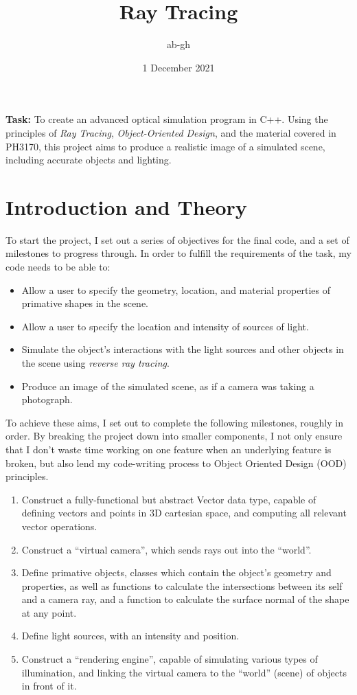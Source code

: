 \documentclass[a4paper]{article}
\title{Ray Tracing}
\author{ab-gh}
\date{1 December 2021}
\begin{document}
\maketitle

{\bf Task:} To create an advanced optical simulation program in C++. Using the principles of {\it Ray Tracing}, {\it Object-Oriented Design}, and the material covered in PH3170, this project aims to produce a realistic image of a simulated scene, including accurate objects and lighting.

\section{Introduction and Theory}
To start the project, I set out a series of objectives for the final code, and a set of milestones to progress through. In order to fulfill the requirements of the task, my code needs to be able to:
\begin{itemize}
  \item{Allow a user to specify the geometry, location, and material properties of primative shapes in the scene.}
  \item{Allow a user to specify the location and intensity of sources of light.}
  \item{Simulate the object's interactions with the light sources and other objects in the scene using {\it reverse ray tracing}.}
  \item{Produce an image of the simulated scene, as if a camera was taking a photograph.}
\end{itemize}
To achieve these aims, I set out to complete the following milestones, roughly in order. By breaking the project down into smaller components, I not only ensure that I don't waste time working on one feature when an underlying feature is broken, but also lend my code-writing process to Object Oriented Design (OOD) principles.
\begin{enumerate}
  \item{Construct a fully-functional but abstract Vector data type, capable of defining vectors and points in 3D cartesian space, and computing all relevant vector operations.}
  \item{Construct a ``virtual camera'', which sends rays out into the ``world''.}
  \item{Define primative objects, classes which contain the object's geometry and properties, as well as functions to calculate the intersections between its self and a camera ray, and a function to calculate the surface normal of the shape at any point.}
  \item{Define light sources, with an intensity and position.}
  \item{Construct a ``rendering engine'', capable of simulating various types of illumination, and linking the virtual camera to the ``world'' (scene) of objects in front of it.}
\end{enumerate}
\end{document}
